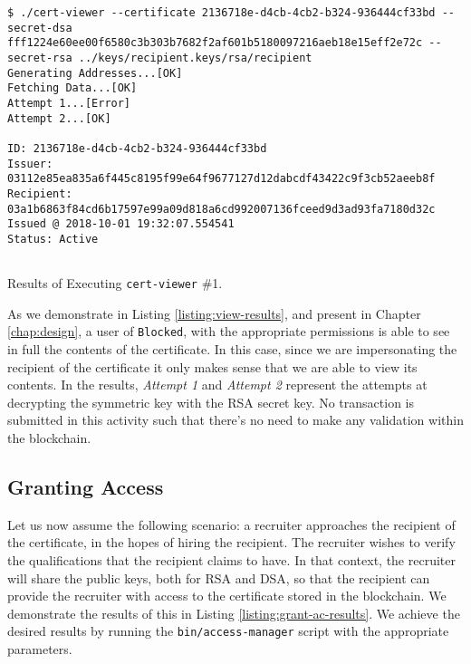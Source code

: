 \begin{listing}[ht]
	\begin{verbatim}
$ ./cert-viewer --certificate 2136718e-d4cb-4cb2-b324-936444cf33bd --secret-dsa fff1224e60ee00f6580c3b303b7682f2af601b5180097216aeb18e15eff2e72c --secret-rsa ../keys/recipient.keys/rsa/recipient
Generating Addresses...[OK]
Fetching Data...[OK]
Attempt 1...[Error]
Attempt 2...[OK]

ID: 2136718e-d4cb-4cb2-b324-936444cf33bd
Issuer: 03112e85ea835a6f445c8195f99e64f9677127d12dabcdf43422c9f3cb52aeeb8f
Recipient: 03a1b6863f84cd6b17597e99a09d818a6cd992007136fceed9d3ad93fa7180d32c
Issued @ 2018-10-01 19:32:07.554541
Status: Active


\end{verbatim}
	\caption{Results of Executing \texttt{cert-viewer} \#1.}
	\label{listing:view-results}
\end{listing}

As we demonstrate in Listing \ref{listing:view-results}, and present in Chapter \ref{chap:design}, a user of \texttt{Blocked}, with the appropriate permissions is able to see in full the contents of the certificate. In this case, since we are impersonating the recipient of the certificate it only makes sense that we are able to view its contents. In the results, \emph{Attempt 1} and \emph{Attempt 2} represent the attempts at decrypting the symmetric key with the RSA secret key. No transaction is submitted in this activity such that there's no need to make any validation within the blockchain.

\subsection{Granting Access}
\label{sec:impl-grant-ac}

Let us now assume the following scenario: a recruiter approaches the recipient of the certificate, in the hopes of hiring the recipient. The recruiter wishes to verify the qualifications that the recipient claims to have. In that context, the recruiter will share the public keys, both for RSA and DSA, so that the recipient can provide the recruiter with access to the certificate stored in the blockchain. We demonstrate the results of this in Listing \ref{listing:grant-ac-results}. We achieve the desired results by running the \texttt{bin/access-manager} script with the appropriate parameters.


